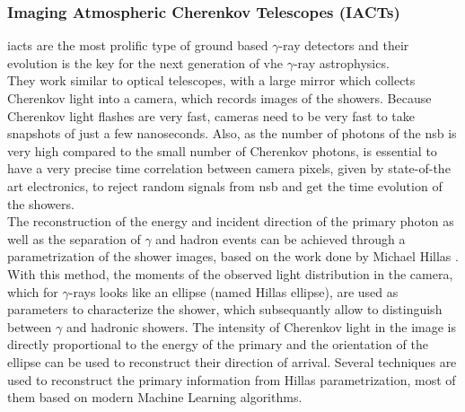 \documentclass[main.tex]{subfiles}
\begin{document}
\subsubsection{Imaging Atmospheric Cherenkov Telescopes (IACTs)}

\glspl{iact} are the most prolific type of ground based $\gamma$-ray detectors and their evolution is the key for the next generation of \gls{vhe} $\gamma$-ray astrophysics.\\
They work similar to optical telescopes, with a large mirror which collects Cherenkov light into a camera, which records images of the showers. 
Because Cherenkov light flashes are very fast, cameras need to be very fast to take snapshots of just  a few nanoseconds. Also, as the number of photons of the \gls{nsb} is very high compared to the small number of Cherenkov photons, is essential to have a very precise time correlation between camera pixels, given by state-of-the art electronics, to reject random signals from \gls{nsb} and get the time evolution of the showers.\\
The reconstruction of the energy and incident direction of the primary photon as well as the separation of $\gamma$ and hadron events can be achieved through a parametrization of the shower images, based on the work done by Michael Hillas \cite{1985Hillas}. With this method, the moments of the observed light distribution in the camera, which for $\gamma$-rays looks like an ellipse (named Hillas ellipse), are used as parameters to characterize the shower, which subsequantly allow to distinguish between $\gamma$  and hadronic showers. The intensity of Cherenkov light in the image is directly proportional to the energy of the primary and the orientation of the ellipse can be used to reconstruct their direction of arrival. Several techniques are used to reconstruct the primary information from Hillas parametrization, most of them based on modern Machine Learning algorithms.\\
\end{document}
